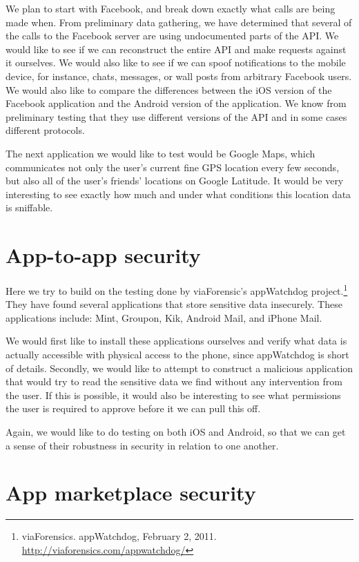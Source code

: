 \documentclass[11pt]{article}
\begin{document}
We plan to start with Facebook, and break down exactly what calls are being made when. From preliminary data gathering, we have determined that several of the calls to the Facebook server are using undocumented parts of the API. We would like to see if we can reconstruct the entire API and make requests against it ourselves. We would also like to see if we can spoof notifications to the mobile device, for instance, chats, messages, or wall posts from arbitrary Facebook users. We would also like to compare the differences between the iOS version of the Facebook application and the Android version of the application. We know from preliminary testing that they use different versions of the API and in some cases different protocols.

The next application we would like to test would be Google Maps, which communicates not only the user's current fine GPS location every few seconds, but also all of the user's friends' locations on Google Latitude. It would be very interesting to see exactly how much and under what conditions this location data is sniffable.

\section{App-to-app security}
Here we try to build on the testing done by viaForensic's appWatchdog project.\footnote{viaForensics. appWatchdog, February 2, 2011. \url{http://viaforensics.com/appwatchdog/}} They have found several applications that store sensitive data insecurely. These applications include: Mint, Groupon, Kik, Android Mail, and iPhone Mail.

We would first like to install these applications ourselves and verify what data is actually accessible with physical access to the phone, since appWatchdog is short of details. Secondly, we would like to attempt to construct a malicious application that would try to read the sensitive data we find without any intervention from the user. If this is possible, it would also be interesting to see what permissions the user is required to approve before it we can pull this off.

Again, we would like to do testing on both iOS and Android, so that we can get a sense of their robustness in security in relation to one another.

\section{App marketplace security}
\end{document}
